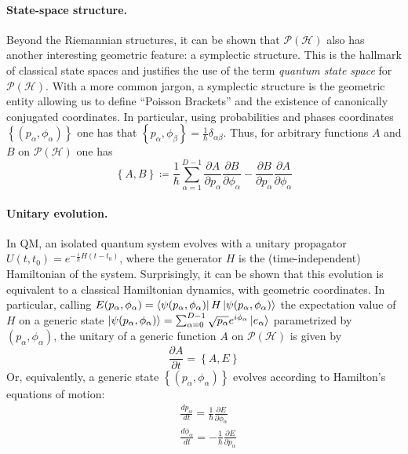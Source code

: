 \documentclass[draft,nofootinbib,pre,twocolumn,showpacs,showkeys,preprintnumbers,floatfix]{revtex4-1}
\newcommand{\1}{\mathbbm{1}}
\newcommand{\PH}{\mathcal{P}(\mathcal{H})}
\begin{document}
\paragraph*{State-space structure.} Beyond the Riemannian structures, it can 
be shown that $\PH$ also has another interesting geometric feature: a symplectic structure.
This is the hallmark of classical state spaces and justifies the use of the term 
\emph{quantum state space} for $\PH$. With a more common jargon, a symplectic
structure is the geometric entity allowing us to define ``Poisson Brackets''
and the existence of canonically conjugated coordinates. In particular, using 
probabilities and phases coordinates $\left\{ (p_\alpha,\phi_\alpha)\right\}$
one has that $\left\{ p_\alpha , \phi_\beta \right\} = \frac{1}{\hbar}\delta_{\alpha\beta}$. Thus,
for arbitrary functions $A$ and $B$ on $\PH$ one has
\begin{equation}
\left\{ A, B\right\} \coloneqq \frac{1}{\hbar}\sum_{\alpha=1}^{D-1} \frac{\partial A}{\partial p_\alpha} \frac{\partial B}{\partial \phi_\alpha} - \frac{\partial B}{\partial p_\alpha} \frac{\partial A}{\partial \phi_\alpha}
\end{equation}


\paragraph*{Unitary evolution.} In QM, an isolated quantum system evolves
with a unitary propagator $U(t,t_0) = e^{-\frac{i}{\hbar}H (t-t_0)}$, where the
generator $H$ is the (time-independent) Hamiltonian of the system. Surprisingly, 
it can be shown \cite{QUA} that this evolution is equivalent to a classical Hamiltonian 
dynamics, with geometric coordinates. In particular, calling $E(p_\alpha, \phi_\alpha) = \bra{\psi(p_\alpha,\phi_\alpha)}H \ket{\psi(p_\alpha,\phi_\alpha)}$
the expectation value of $H$ on a generic state $\ket{\psi(p_\alpha,\phi_\alpha)} = \sum_{\alpha=0}^{D-1}\sqrt{p_\alpha}e^{i\phi_\alpha}\ket{e_\alpha}$
parametrized by $(p_\alpha,\phi_\alpha)$, the unitary of a generic function $A$
on $\PH$ is given by 
\begin{equation}
\frac{\partial A}{\partial t} = \left\{ A,E\right\}
\end{equation}
Or, equivalently, a generic state $\left\{(p_\alpha,\phi_\alpha)\right\}$
evolves according to Hamilton's equations of motion:
\begin{align}
&\frac{dp_\alpha}{dt} = \frac{1}{\hbar}\frac{\partial E}{\partial \phi_\alpha} \nonumber\\
&\frac{d\phi_\alpha}{dt} = -\frac{1}{\hbar}\frac{\partial E}{\partial p_\alpha} \nonumber
\end{align}
\end{document}
